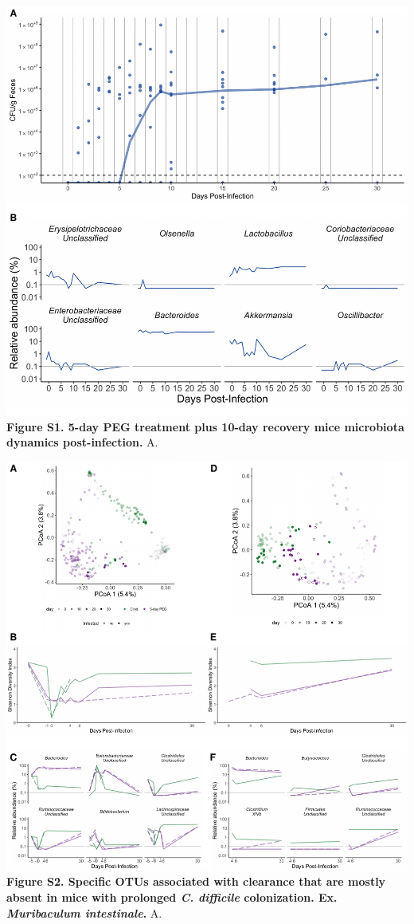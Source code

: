 \documentclass[
  11pt,
]{article}
\begin{document}
\includegraphics{figure_S1.pdf} \textbf{Figure S1. 5-day PEG treatment
plus 10-day recovery mice microbiota dynamics post-infection.} A.
\newpage

\includegraphics{figure_S2.pdf} \textbf{Figure S2. Specific OTUs
associated with clearance that are mostly absent in mice with prolonged
\emph{C. difficile} colonization. Ex. \emph{Muribaculum intestinale}.}
A. \newpage
\end{document}
